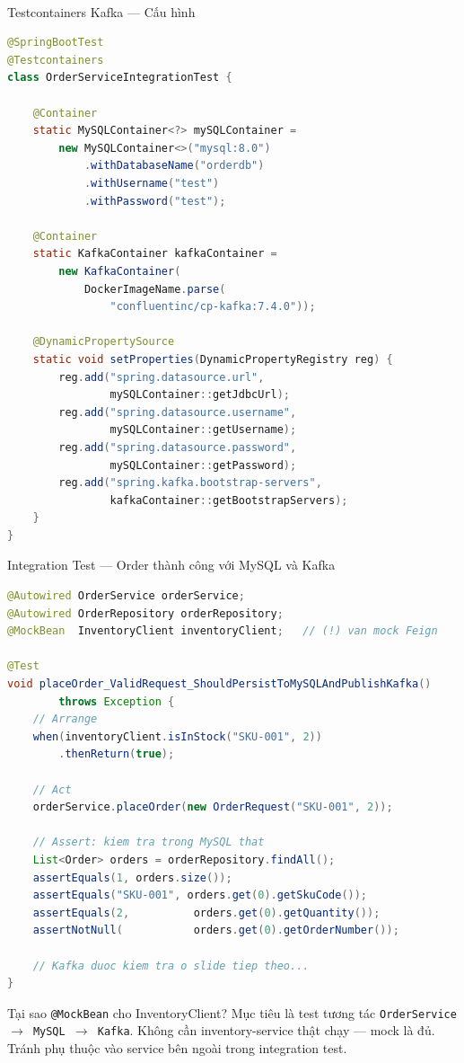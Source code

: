 \documentclass[aspectratio=169,10pt]{beamer}
\newcommand{\sref}[1]{\textsuperscript{\scriptsize\cite{#1}}}
\begin{document}
\begin{frame}[fragile]{Testcontainers Kafka --- Cấu hình\sref{testcontainers-kafka}}
\begin{lstlisting}[language=Java]
@SpringBootTest
@Testcontainers
class OrderServiceIntegrationTest {

    @Container
    static MySQLContainer<?> mySQLContainer =
        new MySQLContainer<>("mysql:8.0")
            .withDatabaseName("orderdb")
            .withUsername("test")
            .withPassword("test");

    @Container
    static KafkaContainer kafkaContainer =
        new KafkaContainer(
            DockerImageName.parse(
                "confluentinc/cp-kafka:7.4.0"));

    @DynamicPropertySource
    static void setProperties(DynamicPropertyRegistry reg) {
        reg.add("spring.datasource.url",
                mySQLContainer::getJdbcUrl);
        reg.add("spring.datasource.username",
                mySQLContainer::getUsername);
        reg.add("spring.datasource.password",
                mySQLContainer::getPassword);
        reg.add("spring.kafka.bootstrap-servers",
                kafkaContainer::getBootstrapServers);
    }
}
\end{lstlisting}
\end{frame}

\begin{frame}[fragile]{Integration Test --- Order thành công với MySQL và Kafka}
\begin{lstlisting}[language=Java]
@Autowired OrderService orderService;
@Autowired OrderRepository orderRepository;
@MockBean  InventoryClient inventoryClient;   // (!) van mock Feign

@Test
void placeOrder_ValidRequest_ShouldPersistToMySQLAndPublishKafka()
        throws Exception {
    // Arrange
    when(inventoryClient.isInStock("SKU-001", 2))
        .thenReturn(true);

    // Act
    orderService.placeOrder(new OrderRequest("SKU-001", 2));

    // Assert: kiem tra trong MySQL that
    List<Order> orders = orderRepository.findAll();
    assertEquals(1, orders.size());
    assertEquals("SKU-001", orders.get(0).getSkuCode());
    assertEquals(2,          orders.get(0).getQuantity());
    assertNotNull(           orders.get(0).getOrderNumber());

    // Kafka duoc kiem tra o slide tiep theo...
}
\end{lstlisting}

  \begin{block}{Tại sao \texttt{@MockBean} cho InventoryClient?}
    Mục tiêu là test tương tác \texttt{OrderService $\to$ MySQL $\to$ Kafka}.
    Không cần inventory-service thật chạy --- mock là đủ.
    Tránh phụ thuộc vào service bên ngoài trong integration test.
  \end{block}
\end{frame}
\end{document}
